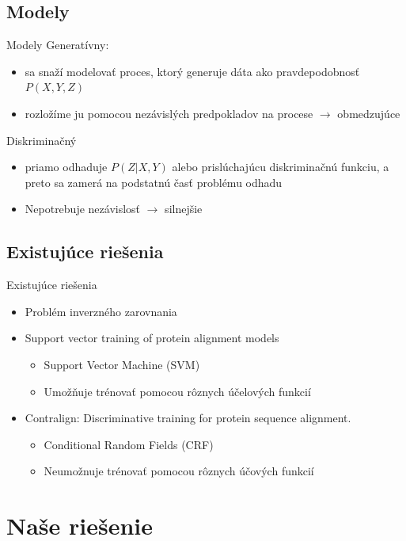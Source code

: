 \documentclass[xcolor=dvipsnames, compress, 12pt]{beamer}
\begin{document}
\subsection{Modely}
\begin{frame}{Modely}
Generatívny:
\begin{itemize}
\item sa snaží modelovať proces, ktorý generuje dáta ako pravdepodobnosť $P(X,Y,Z)$
\item rozložíme ju pomocou nezávislých predpokladov na procese $\longrightarrow$ obmedzujúce
\end{itemize} 
\pause
Diskriminačný
\begin{itemize}
\item priamo odhaduje $P(Z|X,Y)$ alebo prislúchajúcu diskriminačnú funkciu, a preto sa zamerá na podstatnú časť problému odhadu
\item Nepotrebuje nezávislosť $\longrightarrow$ silnejšie
\end{itemize}   
\end{frame}


\subsection{Existujúce riešenia}
\begin{frame}{Existujúce riešenia}
  \begin{itemize}
    \item Problém inverzného zarovnania
    \pause
    \item Support vector training of protein alignment models
    \begin{itemize}
      \item Support Vector Machine (SVM)
      \item Umožňuje trénovať pomocou rôznych účelových funkcií
    \end{itemize}
    \pause
    \item Contralign: Discriminative training for protein sequence alignment.
    \begin{itemize}
      \item Conditional Random Fields (CRF)
      \item Neumožnuje trénovať pomocou rôznych účových funkcií    
    \end{itemize}
  \end{itemize} 
\end{frame}

\section{Naše riešenie}
\end{document}
